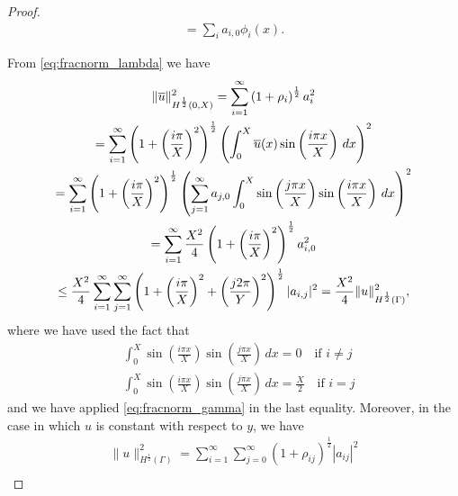 \documentclass[r]{siamart171218}
\begin{document}
\begin{proof}
\begin{multline*}
=  \sum_{i} a_{i,0} \phi_{i}(x).
\end{multline*}

From \eqref{eq:fracnorm_lambda} we have
\begin{multline*}
\|\overline{u}\|^2_{H^{\frac 12}(0,X)}
=\sum_{i=1}^{\infty} \left( 1+ \rho_{i}\right)^{\frac 12}a_i^2\\
=\sum_{i=1}^{\infty}\left( 1+ \left(\frac{i\pi}{X}\right)^2\right)^{\frac 12}\left( \int_0^X \overline{u}(x) \sin\left(\frac{i\pi x}{X}\right)\, dx \right)^2\\
= \sum_{i=1}^{\infty} \left( 1+ \left(\frac{i\pi}{X}\right)^2\right)^{\frac 12}\left( \sum_{j=1}^\infty a_{j,0}\int_0^X \sin\left(\frac{j\pi x}{X}\right) \sin\left(\frac{i\pi x}{X}\right) \, dx  \right)^2\\
= \sum_{i=1}^{\infty} \frac{X^2}{4} \left( 1+ \left(\frac{i\pi}{X}\right)^2\right)^{\frac 12}a_{i,0}^2\\
\leq \frac{X^2}{4}\sum_{i=1}^{\infty} \sum_{j=1}^{\infty}  \left( 1+ \left(\frac{i\pi}{X}\right)^2 + \left(\frac{j2\pi}{Y}\right)^2\right)^{\frac 12} |a_{i,j}|^2 =\frac{X^2}{4}\|u\|^2_{H^{\frac 12}(\Gamma)},
\end{multline*}
where we have used the fact that
\begin{eqnarray*}
&\int_0^X \sin\left(\frac{i\pi x}{X}\right) \sin\left(\frac{j\pi x}{X}\right)\, dx=0 \quad \text{if $i\neq j$}\\
&\int_0^X \sin\left(\frac{i\pi x}{X}\right) \sin\left(\frac{j\pi x}{X}\right)\, dx=\frac X2 \quad \text{if $i =j$}
\end{eqnarray*}
and we have applied \eqref{eq:fracnorm_gamma} in the last equality.
Moreover, in the case in which $u$ is constant with respect to $y$, we have
\begin{multline*}
\|u\|^2_{H^{\frac 12}(\Gamma)}=\sum_{i=1}^{\infty}\sum_{j=0}^{\infty} \left( 1+ \rho_{ij}\right)^{\frac 12}|a_{ij}|^2\\

\end{multline*}
\end{proof}
\end{document}
